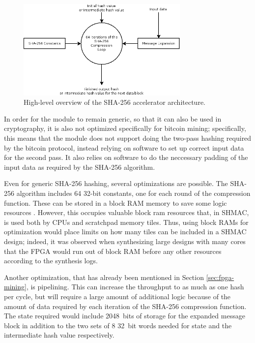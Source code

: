 \begin{figure}[htb]
	\centering
	\includegraphics[width=0.75\textwidth]{Figures/sha256-module}
	\caption{High-level overview of the SHA-256 accelerator architecture.}
	\label{fig:sha256-module}
\end{figure}

In order for the module to remain generic, so that it can also be used in cryptography, it
is also not optimized specifically for bitcoin mining; specifically, this means that the module
does not support doing the two-pass hashing required by the bitcoin protocol, instead relying
on software to set up correct input data for the second pass. It also relies on software to
do the neccessary padding of the input data as required by the SHA-256 algorithm.

Even for generic SHA-256 hashing, several optimizations are possible. The SHA-256 algorithm
includes 64 32-bit constants, one for each round of the compression function. These can be
stored in a block RAM memory to save some logic resources \cite{optimizing-sha2}. However, this occupies valuable
block ram resources that, in SHMAC, is used both by CPUs and scratchpad memory tiles. Thus,
using block RAMs for optimization would place limits on how many tiles can be included in
a SHMAC design; indeed, it was observed when synthesizing large designs with many cores
that the FPGA would run out of block RAM before any other resources according to the synthesis logs.

Another optimization, that has already been mentioned in Section \ref{sec:fpga-mining}, is
pipelining. This can increase the throughput to as much as one hash per cycle, but will require
a large amount of additional logic because of the amount of data required by each iteration
of the SHA-256 compression function. The state required would include 2048~bits of storage
for the expanded message block in addition to the two sets of 8 32~bit words needed for
state and the intermediate hash value respectively.


